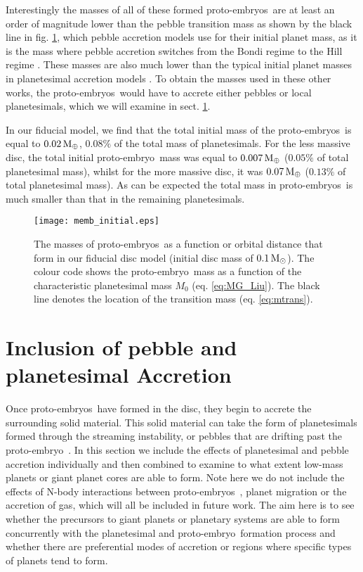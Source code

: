 \documentclass[a4paper,fleqn,usenatbib]{mnras}
\newcommand{\me}{{\, {\rm M}_{\oplus}}}
\newcommand{\msun}{{\, {\rm M}_{\odot}}}
\newcommand{\emb}{{{proto-embryo~}}}
\newcommand{\embs}{{{proto-embryos~}}}
\begin{document}
Interestingly the masses of all of these formed \embs are at least an order of magnitude lower than the pebble transition mass as shown by the black line in fig. \ref{fig:embryo_masses}, which pebble accretion models use for their initial planet mass, as it is the mass where pebble accretion switches from the Bondi regime to the Hill regime \citep{Bitsch15,Bitsch19,Coleman19}.
These masses are also much lower than the typical initial planet masses in planetesimal accretion models \citep[e.g.][]{Mordasini15,ColemanNelson14,ColemanNelson16,ColemanNelson16b}.
To obtain the masses used in these other works, the \embs would have to accrete either pebbles or local planetesimals, which we will examine in sect. \ref{sec:accretion}.

In our fiducial model, we find that the total initial mass of the \embs is equal to $0.02 \me$, $0.08\%$ of the total mass of planetesimals.
For the less massive disc, the total initial \emb mass was equal to $0.007 \me$ ($0.05\%$ of total planetesimal mass), whilst for the more massive disc, it was $0.07 \me$ ($0.13\%$ of total planetesimal mass). 
As can be expected the total mass in \embs is much smaller than that in the remaining planetesimals.

\begin{figure}
\centering
\texttt{[image: memb\_initial.eps]}
\caption{The masses of \embs as a function or orbital distance that form in our fiducial disc model (initial disc mass of $0.1 \msun$). The colour code shows the \emb mass as a function of the characteristic planetesimal mass $M_0$ (eq. \ref{eq:MG_Liu}). The black line denotes the location of the transition mass (eq. \ref{eq:mtrans}).}
\label{fig:embryo_masses}
\end{figure}

\section{Inclusion of pebble and planetesimal Accretion}
\label{sec:accretion}
Once \embs have formed in the disc, they begin to accrete the surrounding solid material.
This solid material can take the form of planetesimals formed through the streaming instability, or pebbles that are drifting past the \emb.
In this section we include the effects of planetesimal and pebble accretion individually and then combined to examine to what extent low-mass planets or giant planet cores are able to form.
Note here we do not include the effects of N-body interactions between \embs, planet migration or the accretion of gas, which will all be included in future work.
The aim here is to see whether the precursors to giant planets or planetary systems are able to form concurrently with the planetesimal and \emb formation process and whether there are preferential modes of accretion or regions where specific types of planets tend to form.
\end{document}
